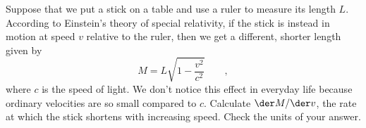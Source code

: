 Suppose that we put a stick on a table and use a ruler
to measure its length $L$.
According to Einstein's theory of special relativity,
if the stick is instead in motion at speed $v$ relative to the ruler, then
we get a different, shorter length given by
\begin{equation*}
  M = L\sqrt{1-\frac{v^2}{c^2}} \qquad ,
\end{equation*}
where $c$ is the speed of light. We don't notice this effect in
everyday life because ordinary velocities are so small compared
to $c$.
Calculate $\der M/\der v$, the rate at which the stick shortens
with increasing speed. Check the units of your answer.\answercheck
